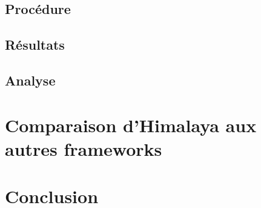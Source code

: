 	\section{Procédure}
	\section{Résultats}
	\section{Analyse}
\chapter{Comparaison d'Himalaya aux autres frameworks}
\chapter{Conclusion}
